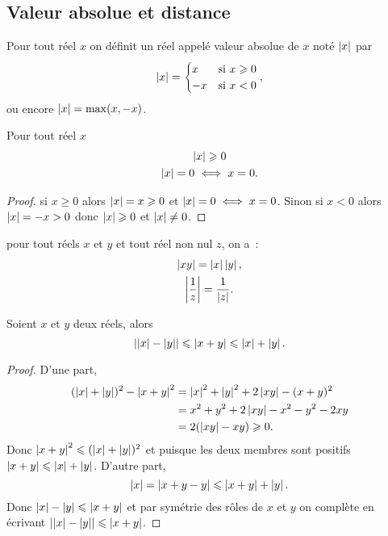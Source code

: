 \subsection{Valeur absolue et distance}

\begin{defdef}
  Pour tout réel \(x\) on définit un réel appelé valeur absolue de \(x\) noté \(\abs{x}\) par
  \begin{equation}
    \abs{x}=\begin{cases} x & \text{si } x\geqslant 0 \\ -x & \text{si } x<0\end{cases},
  \end{equation}
ou encore \(\abs{x}=\max(x,-x)\).
\end{defdef}
\begin{prop}
  Pour tout réel \(x\)
  \begin{gather}
    \abs{x}\geqslant 0 \\
    \abs{x}=0 \iff x=0.
  \end{gather}
\end{prop}
\begin{proof}
  si \(x\geqslant 0\) alors \(\abs{x}=x\geqslant 0\) et \(\abs{x}=0 \iff x=0\). Sinon si \(x<0\) alors \(\abs{x}=-x>0\) donc \(\abs{x}\geqslant 0\) et \(\abs{x}\neq 0\).
\end{proof}
\begin{prop}
  pour tout réels \(x\) et \(y\) et tout réel non nul \(z\), on a~:
  \begin{gather}
    \abs{xy}=\abs{x}\abs{y}, \\ 
    \abs{\frac{1}{z}}=\frac{1}{\abs{z}}.
  \end{gather}
\end{prop}
\begin{prop}
  Soient \(x\) et \(y\) deux réels, alors
  \begin{equation}
    \abs{\abs{x}-\abs{y}}\leqslant \abs{x+y} \leqslant \abs{x}+\abs{y}.
  \end{equation}
\end{prop}
\begin{proof}
  D'une part,
  \begin{align}
    (\abs{x}+\abs{y})^2-\abs{x+y}^2 &=\abs{x}^2+\abs{y}^2+2\abs{xy}-(x+y)^2\\
    &=x^2+y^2+2\abs{xy}-x^2-y^2-2xy\\
    &=2(\abs{xy}-xy)\geqslant 0.
  \end{align}
Donc \(\abs{x+y}^2\leqslant (\abs{x}+\abs{y})^2\) et puisque les deux membres sont positifs \(\abs{x+y}\leqslant \abs{x}+\abs{y}\). D'autre part,
\begin{equation}
  \abs{x}=\abs{x+y-y}\leqslant \abs{x+y}+\abs{y}.
\end{equation}
Donc \(\abs{x}-\abs{y}\leqslant \abs{x+y}\) et par symétrie des rôles de \(x\) et \(y\) on complète en écrivant \(\abs{\abs{x}-\abs{y}}\leqslant \abs{x+y}\).
\end{proof}
